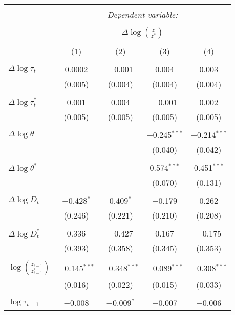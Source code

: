 
\begin{tabular}{@{\extracolsep{5pt}}lcccc} 
\\[-1.8ex]\hline 
\hline \\[-1.8ex] 
 & \multicolumn{4}{c}{\textit{Dependent variable:}} \\ 
\cline{2-5} 
\\[-1.8ex] & \multicolumn{4}{c}{$\Delta \log \left(\frac{z}{z^*} \right)$} \\ 
\\[-1.8ex] & (1) & (2) & (3) & (4)\\ 
\hline \\[-1.8ex] 
 $\Delta \log \tau_t$ & 0.0002 & $-$0.001 & 0.004 & 0.003 \\ 
  & (0.005) & (0.004) & (0.004) & (0.004) \\ 
  & & & & \\ 
 $\Delta \log \tau_t^*$ & 0.001 & 0.004 & $-$0.001 & 0.002 \\ 
  & (0.005) & (0.005) & (0.005) & (0.005) \\ 
  & & & & \\ 
 $\Delta \log \theta$ &  &  & $-$0.245$^{***}$ & $-$0.214$^{***}$ \\ 
  &  &  & (0.040) & (0.042) \\ 
  & & & & \\ 
 $\Delta \log \theta^*$ &  &  & 0.574$^{***}$ & 0.451$^{***}$ \\ 
  &  &  & (0.070) & (0.131) \\ 
  & & & & \\ 
 $\Delta \log D_t$ & $-$0.428$^{*}$ & 0.409$^{*}$ & $-$0.179 & 0.262 \\ 
  & (0.246) & (0.221) & (0.210) & (0.208) \\ 
  & & & & \\ 
 $\Delta \log D_t^*$ & 0.336 & $-$0.427 & 0.167 & $-$0.175 \\ 
  & (0.393) & (0.358) & (0.345) & (0.353) \\ 
  & & & & \\ 
 $\log \left(\frac{z_{t-1}}{z_{t-1}^*} \right)$ & $-$0.145$^{***}$ & $-$0.348$^{***}$ & $-$0.089$^{***}$ & $-$0.308$^{***}$ \\ 
  & (0.016) & (0.022) & (0.015) & (0.033) \\ 
  & & & & \\ 
 $\log \tau_{t-1}$ & $-$0.008 & $-$0.009$^{*}$ & $-$0.007 & $-$0.006 \\ 

\end{tabular}
